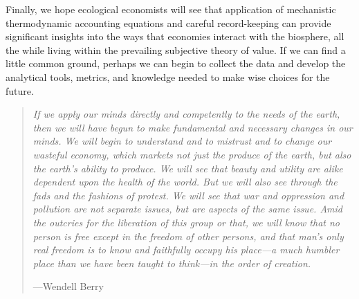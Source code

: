Finally, we hope ecological economists will see that 
application of mechanistic thermodynamic accounting equations
and careful record-keeping can provide significant
insights into the ways that economies interact
with the biosphere, all the while living within the 
prevailing subjective theory of value.
If we can find a little common ground, perhaps we can begin
to collect the data and develop the analytical tools, metrics, and knowledge
needed to make wise choices for the future.


\cleardoublepage{} %

\vspace*{50 mm}

\small{}

\begin{quote}
	\emph{If we apply our minds directly and competently to the needs of the earth, 
	then we will have begun to make fundamental and necessary changes in our minds. 
	We will begin to understand and to mistrust and to change our wasteful economy, 
	which markets not just the produce of the earth, 
	but also the earth's ability to produce. 
	We will see that beauty and utility are alike dependent upon the health of the world. 
	But we will also see through the fads and the fashions of protest. 
	We will see that war and oppression and pollution are not separate issues, 
	but are aspects of the same issue. 
	Amid the outcries for the liberation of this group or that, 
	we will know that no person is free except in the freedom of other persons, 
	and that man's only real freedom 
	is to know and faithfully occupy his place---a much humbler place 
	than we have been taught to think---in the order of creation.}~\cite[p.~89]{Berry:2002aa}

	\hfill---Wendell Berry
\end{quote}

\normalsize{}

\clearpage{}








